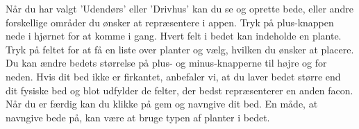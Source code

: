 \begin{minipage}{0.55\textwidth}    
Når du har valgt 'Udendørs' eller 'Drivhus' kan du se og oprette bede, eller andre forskellige områder du ønsker at repræsentere i appen. Tryk på plus-knappen nede i hjørnet for at komme i gang.
Hvert felt i bedet kan indeholde en plante. Tryk på feltet for at få en liste over planter og vælg, hvilken du ønsker at placere. Du kan ændre bedets størrelse på plus- og minus-knapperne til højre og for neden. Hvis dit bed ikke er firkantet, anbefaler vi, at du laver bedet større end dit fysiske bed og blot udfylder de felter, der bedst repræsenterer en anden facon. Når du er færdig kan du klikke på gem og navngive dit bed. En måde, at navngive bede på, kan være at bruge typen af planter i bedet.
\end{minipage} 

